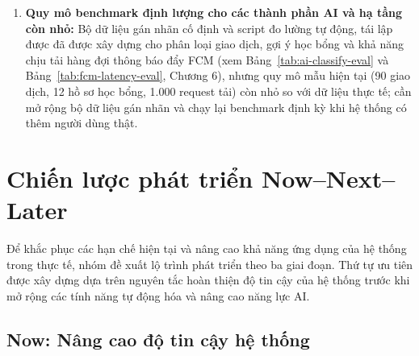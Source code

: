 \begin{enumerate}
    \item \textbf{Quy mô benchmark định lượng cho các thành phần AI và hạ tầng còn nhỏ:} Bộ dữ liệu gán nhãn cố định và script đo lường tự động, tái lập được đã được xây dựng cho phân loại giao dịch, gợi ý học bổng và khả năng chịu tải hàng đợi thông báo đẩy FCM (xem Bảng~\ref{tab:ai-classify-eval} và Bảng~\ref{tab:fcm-latency-eval}, Chương 6), nhưng quy mô mẫu hiện tại (90 giao dịch, 12 hồ sơ học bổng, 1.000 request tải) còn nhỏ so với dữ liệu thực tế; cần mở rộng bộ dữ liệu gán nhãn và chạy lại benchmark định kỳ khi hệ thống có thêm người dùng thật.
\end{enumerate}

\section{Chiến lược phát triển Now--Next--Later}

Để khắc phục các hạn chế hiện tại và nâng cao khả năng ứng dụng của hệ thống trong thực tế, nhóm đề xuất lộ trình phát triển theo ba giai đoạn. Thứ tự ưu tiên được xây dựng dựa trên nguyên tắc hoàn thiện độ tin cậy của hệ thống trước khi mở rộng các tính năng tự động hóa và nâng cao năng lực AI.

\subsection{Now: Nâng cao độ tin cậy hệ thống}

